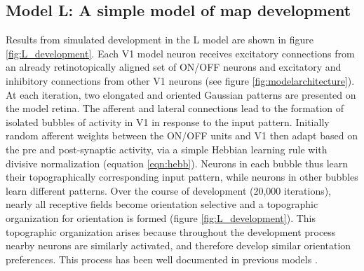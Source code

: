 \documentclass{article}
\begin{document}
\subsection*{Model L: A simple model of map development}

Results from simulated development in the L model are shown in figure
\ref{fig:L_development}. Each V1 model neuron receives excitatory
connections from an already retinotopically aligned set of ON/OFF
neurons and excitatory and inhibitory connections from other V1
neurons (see figure \ref{fig:modelarchitecture}). At each iteration,
two elongated and oriented Gaussian patterns are presented on the
model retina.  The afferent and lateral connections lead to the
formation of isolated bubbles of activity in V1 in response to the input
pattern. Initially random afferent weights between the ON/OFF units
and V1 then adapt based on the pre and post-synaptic activity, via a
simple Hebbian learning rule with divisive normalization (equation
\ref{eqn:hebb}). Neurons in each bubble thus learn their
topographically corresponding input pattern, while neurons in other
bubbles learn different patterns.  Over the course of development
(20,000 iterations), nearly all receptive fields become orientation
selective and a topographic organization for orientation is formed (figure
\ref{fig:L_development}). This topographic organization arises because
throughout the development process nearby neurons are similarly
activated, and therefore develop similar orientation preferences. This
process has been well documented in previous models
\citep{Miikkulainen2005,Burger1999}.
\end{document}
